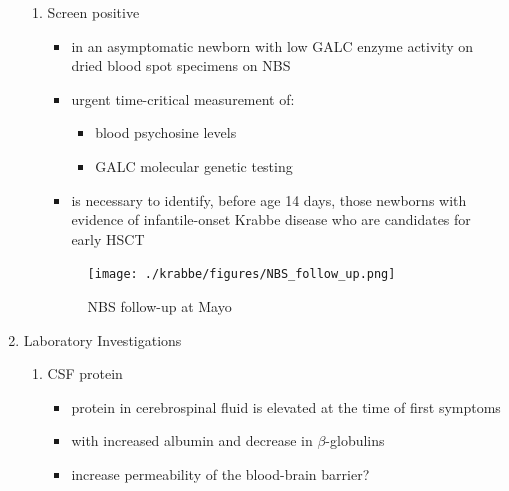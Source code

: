 \documentclass{scrartcl}
\begin{document}
\begin{enumerate}
\begin{enumerate}
\item Screen positive
\label{sec:org6f951f6}
\begin{itemize}
\item in an asymptomatic newborn with low GALC enzyme activity
on dried blood spot specimens on NBS
\item urgent time-critical measurement of:
\begin{itemize}
\item blood psychosine levels
\item GALC molecular genetic testing
\end{itemize}
\item is necessary to identify, before age 14 days, those newborns with
evidence of infantile-onset Krabbe disease who are candidates for
early HSCT
\end{itemize}

\begin{figure}[htbp]
\centering
\texttt{[image: ./krabbe/figures/NBS\_follow\_up.png]}
\caption{\label{fig:orge192c0f}
NBS follow-up at Mayo}
\end{figure}
\end{enumerate}

\item Laboratory Investigations
\label{sec:orgbcb550b}
\begin{enumerate}
\item CSF protein
\label{sec:org9cd4959}
\begin{itemize}
\item protein in cerebrospinal fluid is elevated at the time of first symptoms
\item with increased albumin and decrease in \(\beta\)-globulins
\item increase permeability of the blood-brain barrier?
\end{itemize}


\end{enumerate}
\end{enumerate}
\end{document}
